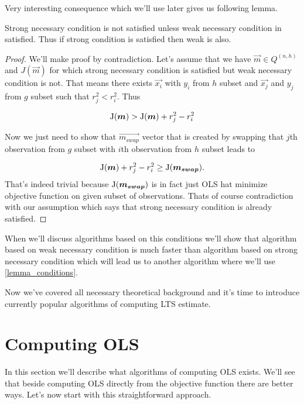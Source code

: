Very interesting consequence which we'll use later gives us following lemma.

\begin{lemma} \label{lemma_conditions}
	Strong necessary condition is not satisfied unless weak necessary condition in satisfied. Thus if strong condition is satisfied then weak is also. 
\end{lemma}

\begin{proof}
	We'll make proof by contradiction. Let's assume that we have $\vec{m} \in Q^{(n, h)}$ and $J(\vec{m})$ for which strong necessary condition is satisfied but weak necessary condition is not. That means there exists $\vec{x_i}$ with $y_i$ from $h$ subset and $\vec{x_j}$ and $y_j$ from $g$ subset such that $r_j^2 < r_i^2$. Thus 

	\begin{equation} 
		\operatorname{J}(\boldsymbol{m}) > \operatorname{J}(\boldsymbol{m}) + r_j^2 - r_i^2  
	\end{equation}

	Now we just need to show that $\vec{m_{swap}}$ vector that is created by swapping that $j$th observation from $g$ subset with $i$th observation from $h$ subset leads to 

	\begin{equation} 
	  \operatorname{J}(\boldsymbol{m}) + r_j^2 - r_i^2  \geq \operatorname{J}(\boldsymbol{m_{swap}}).
	\end{equation}
	That's indeed trivial because $\operatorname{J}(\boldsymbol{m_{swap}})$ is in fact just OLS hat minimize objective function on given subset of observations. Thats of course contradiction with our assumption which says that strong necessary condition is already satisfied. 
\end{proof}
When we'll discuss algorithms based on this conditions we'll show that algorithm based on weak necessary condition is much faster than algorithm based on strong necessary condition which will lead us to another algorithm where we'll use \ref{lemma_conditions}.

Now we've covered all necessary theoretical background and it's time to introduce currently popular algorithms of computing LTS estimate.

\section{Computing OLS}  \label{ols:computing}
In this section we'll describe what algorithms of computing OLS exists. We'll see that beside computing OLS directly from the objective function there are better ways. Let's now start with this straightforward  approach.


